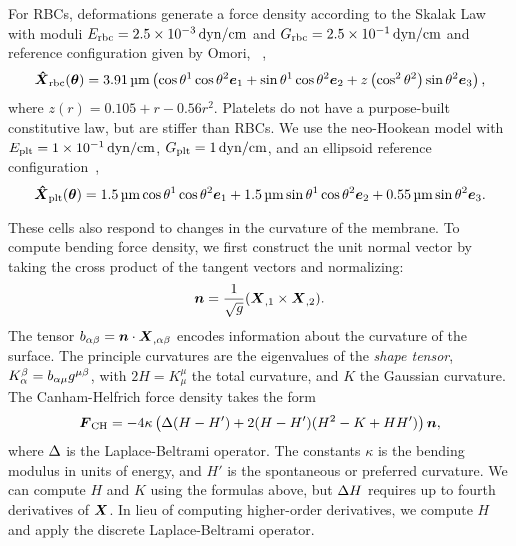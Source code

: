 For RBCs, deformations generate a force density according to the Skalak Law with moduli
$E_\text{rbc} = \scinot{2.5}{-3}\dynpercm$ and $G_\text{rbc} = \scinot{2.5}{-1}\dynpercm$
and reference configuration given by Omori, ~\cite{Omori:2012hw},
\begin{equation*}
    \vec{\hat{X}}_\text{rbc}(\qs) = 3.91\um\left(\cos\q[1]\cos\q[2]\e_1 + \sin\q[1]\cos\q[2]\e_2 + z\left(\cos^2\q[2]\right)\sin\q[2]\e_3\right),
\end{equation*}
where $z(r) = 0.105 + r - 0.56r^2$. Platelets do not have a purpose-built constitutive
law, but are stiffer than RBCs. We use the neo-Hookean model with
$E_\text{plt} = \scinot{1}{-1}\dynpercm$, $G_\text{plt} = 1\dynpercm$, and an ellipsoid
reference configuration~\cite{Frojmovic:1982wk},
\begin{equation*}
    \vec{\hat{X}}_\text{plt}(\qs) = 1.5\um\cos\q[1]\cos\q[2]\e_1 + 1.5\um\sin\q[1]\cos\q[2]\e_2 + 0.55\um\sin\q[2]\e_3.
\end{equation*}

These cells also respond to changes in the curvature of the membrane. To compute bending
force density, we first construct the unit normal vector by taking the cross product of
the tangent vectors and normalizing:
\begin{equation}\label{eq:unit-normal}
    \boldsymbol{n} = \frac{1}{\sqrt{g}} (\boldsymbol{X}_{,1}\times\boldsymbol{X}_{,2}).
\end{equation}
The tensor $b_{\alpha\beta} = \boldsymbol{n}\cdot\boldsymbol{X}_{,\alpha\beta}$ encodes information about the
curvature of the surface. The principle curvatures are the eigenvalues of the
\emph{shape tensor}, $K_\alpha^\beta = b_{\alpha\mu}g^{\mu\beta}$, with
$2H = K_\mu^\mu$ the total curvature, and $K$ the Gaussian curvature. The Canham-Helfrich
force density takes the form~\cite{Zhongcan:1989ue}
\begin{equation}\label{eq:bending-force}
    \boldsymbol{F}_\text{CH} = -4\kappa\left(\Delta(H-H')+2(H-H')(H^2-K+HH')\right)\boldsymbol{n},
\end{equation}
where $\Delta$ is the Laplace-Beltrami operator. The constants $\kappa$ is the
bending modulus in units of energy, and $H'$ is the spontaneous or preferred curvature.
We can compute $H$ and $K$ using the formulas above, but
$\Delta H$ requires up to fourth derivatives of $\boldsymbol{X}$. In lieu of computing
higher-order derivatives, we compute $H$ and apply the discrete Laplace-Beltrami
operator.

